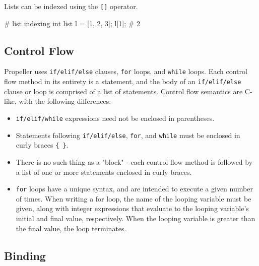 \noindent Lists can be indexed using the \verb|[]| operator.

\begin{mylistingn}
# list indexing
int list l = [1, 2, 3];
l[1];           # 2
\end{mylistingn}

\subsection{Control Flow}
Propeller uses \texttt{if/elif/else} clauses, \texttt{for} loops, and \texttt{while} loops.
Each control flow method in its entirety is a statement, and the body of an
\texttt{if/elif/else} clause or loop is comprised of a list of statements. Control flow
semantics are C-like, with the following differences:
\begin{itemize}
    \item \texttt{if/elif/while} expressions need not be enclosed in parentheses.
    \item Statements following \texttt{if/elif/else}, \texttt{for}, and \texttt{while} must
          be enclosed in curly braces \texttt{\{ \}}.
    \item There is no such thing as a "block" - each control flow method is followed by a list
          of one or more statements enclosed in curly braces.
    \item \texttt{for} loops have a unique syntax, and are intended to execute a given number of
          times. When writing a for loop, the name of the looping variable must be given, along
          with integer expressions that evaluate to the looping variable's initial and final
          value, respectively. When the looping variable is greater than the final value, the
          loop terminates.
\end{itemize}



\subsection{Binding}

